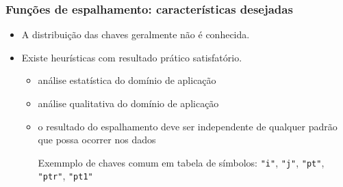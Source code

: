 \documentclass{beamer}
\begin{document}
\begin{frame}

\frametitle{Funções de espalhamento: características desejadas}

\begin{itemize}

  \item A distribuição das chaves \alert{geralmente} não é conhecida.

  \item Existe heurísticas com resultado prático satisfatório.

    \begin{itemize}

      \item análise estatística do domínio de aplicação

      \item análise qualitativa do domínio de aplicação

      \item o resultado do espalhamento deve ser independente de qualquer padrão
        que possa ocorrer nos dados

        Exemmplo de chaves comum em tabela de símbolos:
        \texttt{"i"}, \texttt{"j"}, \texttt{"pt"}, \texttt{"ptr"}, \texttt{"pt1"}

    \end{itemize}

\end{itemize}

\end{frame}
\end{document}
